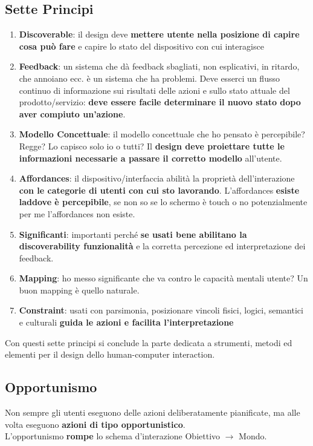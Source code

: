 \documentclass[10pt]{article}
\begin{document}
\subsection{Sette Principi}
\begin{enumerate}
\item \textbf{Discoverable}: il design deve \textbf{mettere utente nella posizione di capire cosa può fare} e capire lo stato del dispositivo con cui interagisce
\item \textbf{Feedback}: un sistema che dà feedback sbagliati, non esplicativi, in ritardo, che annoiano ecc. è un sistema che ha problemi. Deve esserci un flusso continuo di informazione sui risultati delle azioni e sullo stato attuale del prodotto/servizio: \textbf{deve essere facile determinare il nuovo stato dopo aver compiuto un'azione}.
\item \textbf{Modello Concettuale}: il modello concettuale che ho pensato è percepibile? Regge? Lo capisco solo io o tutti? Il \textbf{design deve proiettare tutte le informazioni necessarie a passare il corretto modello} all'utente.
\item \textbf{Affordances}: il dispositivo/interfaccia abilità la proprietà dell'interazione \textbf{con le categorie di utenti con cui sto lavorando}. L'affordances \textbf{esiste laddove è percepibile}, se non so se lo schermo è touch o no potenzialmente per me l'affordances non esiste.
\item \textbf{Significanti}: importanti perché \textbf{se usati bene abilitano la discoverability funzionalità} e la corretta percezione ed interpretazione dei feedback.
\item \textbf{Mapping}: ho messo significante che va contro le capacità mentali utente? Un buon mapping è quello naturale.
\item \textbf{Constraint}: usati con parsimonia, posizionare vincoli fisici, logici, semantici e culturali \textbf{guida le azioni e facilita l'interpretazione}
\end{enumerate}
Con questi sette principi si conclude la parte dedicata a strumenti, metodi ed elementi per il design dello human-computer interaction.\\
\subsection{Opportunismo}
Non sempre gli utenti eseguono delle azioni deliberatamente pianificate, ma alle volta eseguono \textbf{azioni di tipo opportunistico}.\\L'opportunismo \textbf{rompe} lo schema d'interazione Obiettivo $\rightarrow$ Mondo.
\end{document}
